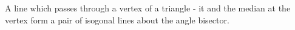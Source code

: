 A line which passes through a vertex of a triangle - it and the median
at the vertex form a pair of isogonal lines about the angle bisector.